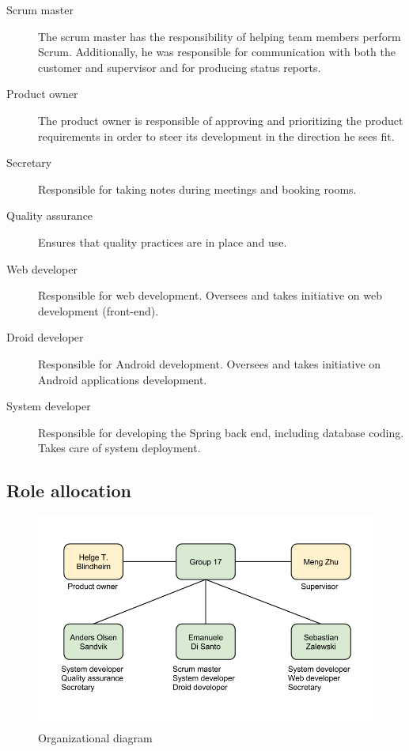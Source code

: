 \begin{description}

\item[Scrum master]
The scrum master has the responsibility of helping team members perform Scrum.
Additionally, he was responsible for communication with both the customer and supervisor
and for producing status reports.
\item[Product owner]
The product owner is responsible of approving and prioritizing the product
requirements in order to steer its development in the direction he sees fit.
\item[Secretary]
Responsible for taking notes during meetings and booking rooms.
\item[Quality assurance]
Ensures that quality practices are in place and use.
\item[Web developer]
Responsible for web development. Oversees and takes initiative on web development (front-end).
\item[Droid developer]
Responsible for Android development. Oversees and takes initiative on Android applications development.
\item[System developer]
Responsible for developing the Spring back end, including database coding. Takes care of system deployment.
\end{description}

\subsection{Role allocation}

\begin{figure}[H]
\includegraphics[scale=0.5]{../Figures/organizational-diagram.png}
\caption{Organizational diagram}
\label{figure:orgdia}
\end{figure}

